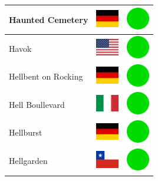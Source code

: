 \documentclass[12pt, a4paper, twoside]{report}
\begin{document}
\begin{center}
\begin{longtable}{|p{5cm}|p{2cm}|p{2cm}|}
Haunted Cemetery & \includegraphics[width=1cm]{4x3/de} & \includegraphics[width=1cm]{likes/y} \\ \hline
Havok & \includegraphics[width=1cm]{4x3/us} & \includegraphics[width=1cm]{likes/y} \\ \hline
Hellbent on Rocking & \includegraphics[width=1cm]{4x3/de} & \includegraphics[width=1cm]{likes/y} \\ \hline
Hell Boullevard & \includegraphics[width=1cm]{4x3/it} & \includegraphics[width=1cm]{likes/y} \\ \hline
Hellburst & \includegraphics[width=1cm]{4x3/de} & \includegraphics[width=1cm]{likes/y} \\ \hline
Hellgarden & \includegraphics[width=1cm]{4x3/cl} & \includegraphics[width=1cm]{likes/y} \\ \hline

\end{longtable}
\end{center}
\end{document}
